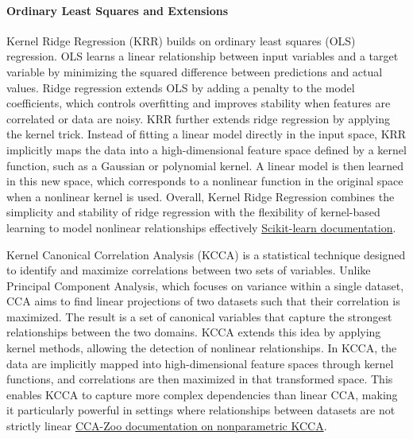 \paragraph{Ordinary Least Squares and Extensions}
\label{sec:background_ml_lr}
Kernel Ridge Regression (KRR) builds on ordinary least squares (OLS) regression. OLS learns a linear relationship between input variables and a target variable by minimizing the squared difference between predictions and actual values. Ridge regression extends OLS by adding a penalty to the model coefficients, which controls overfitting and improves stability when features are correlated or data are noisy.
KRR further extends ridge regression by applying the kernel trick. Instead of fitting a linear model directly in the input space, KRR implicitly maps the data into a high-dimensional feature space defined by a kernel function, such as a Gaussian or polynomial kernel. A linear model is then learned in this new space, which corresponds to a nonlinear function in the original space when a nonlinear kernel is used.
Overall, Kernel Ridge Regression combines the simplicity and stability of ridge regression with the flexibility of kernel-based learning to model nonlinear relationships effectively \href{https://scikit-learn.org/stable/modules/linear_model.html}{Scikit-learn documentation}.

\label{sec:background_ml_kcca}
\noindent
Kernel Canonical Correlation Analysis (KCCA) is a statistical technique designed to identify and maximize correlations between two sets of variables. Unlike Principal Component Analysis, which focuses on variance within a single dataset, CCA aims to find linear projections of two datasets such that their correlation is maximized. The result is a set of canonical variables that capture the strongest relationships between the two domains. KCCA extends this idea by applying kernel methods, allowing the detection of nonlinear relationships. In KCCA, the data are implicitly mapped into high-dimensional feature spaces through kernel functions, and correlations are then maximized in that transformed space. This enables KCCA to capture more complex dependencies than linear CCA, making it particularly powerful in settings where relationships between datasets are not strictly linear \cite{1202783} \cite{5644899} \href{https://cca-zoo.readthedocs.io/en/stable/modules/generated/cca_zoo.nonparametric.KCCA.html#cca_zoo.nonparametric.KCCA}{CCA-Zoo documentation on nonparametric KCCA}.

